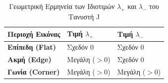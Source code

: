 \documentclass[12pt, a4paper]{article}
\begin{document}
\begin{table}[H]                                                                                                                                                            
      \centering                                                                                                                                                              
      \caption{Γεωμετρική Ερμηνεία των Ιδιοτιμών $\lambda_+$ και $\lambda_-$ του Τανυστή J}                                                                                                              
      \label{tab:lambda_values}
      \begin{tabular}{>{\bfseries}m{4cm} m{3cm} m{3cm}}                                                                                                                       
          \toprule                                                                                                                                                            
          Περιοχή Εικόνας & Τιμή $\lambda_+$ & Τιμή $\lambda_-$ \\                                                                                                            
          \midrule                                                                                                                                                            
          Επίπεδη (Flat) & Σχεδόν $0$ & Σχεδόν $0$ \\                                                                                                                         
          Ακμή (Edge) & Μεγάλη ($>0$) & Σχεδόν $0$ \\                                                                                                                         
          Γωνία (Corner) & Μεγάλη ($>0$) & Μεγάλη ($>0$) \\                                                                                                                   
          \bottomrule                                                                                                                                                         
      \end{tabular}                                                                                                                                                           
  \end{table}
\end{document}

